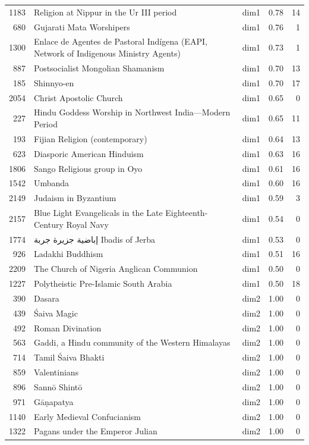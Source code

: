 \begin{tabular}{rllrr}
1183 & Religion at Nippur in the Ur III period & dim1 & 0.78 & 14 \\
680 & Gujarati Mata Worshipers & dim1 & 0.76 & 1 \\
1300 & Enlace de Agentes de Pastoral Indígena (EAPI, Network of Indigenous Ministry Agents) & dim1 & 0.73 & 1 \\
887 & Postsocialist Mongolian Shamanism & dim1 & 0.70 & 13 \\
185 & Shinnyo-en & dim1 & 0.70 & 17 \\
2054 & Christ Apostolic Church & dim1 & 0.65 & 0 \\
227 & Hindu Goddess Worship in Northwest India—Modern Period & dim1 & 0.65 & 11 \\
193 & Fijian Religion (contemporary) & dim1 & 0.64 & 13 \\
623 & Diasporic American Hinduism & dim1 & 0.63 & 16 \\
1806 & Sango Religious group in Oyo & dim1 & 0.61 & 16 \\
1542 & Umbanda & dim1 & 0.60 & 16 \\
2149 & Judaism in Byzantium & dim1 & 0.59 & 3 \\
2157 & Blue Light Evangelicals in the Late Eighteenth-Century Royal Navy & dim1 & 0.54 & 0 \\
1774 & إباضية جزيرة جربة Ibadis of Jerba & dim1 & 0.53 & 0 \\
926 & Ladakhi Buddhism & dim1 & 0.51 & 16 \\
2209 & The Church of Nigeria Anglican Communion & dim1 & 0.50 & 0 \\
1227 & Polytheistic Pre-Islamic South Arabia & dim1 & 0.50 & 18 \\
390 & Dasara & dim2 & 1.00 & 0 \\
439 & Śaiva Magic & dim2 & 1.00 & 0 \\
492 & Roman Divination & dim2 & 1.00 & 0 \\
563 & Gaddi, a Hindu community of the Western Himalayas & dim2 & 1.00 & 0 \\
714 & Tamil Śaiva Bhakti & dim2 & 1.00 & 0 \\
859 & Valentinians & dim2 & 1.00 & 0 \\
896 & Sannō Shintō & dim2 & 1.00 & 0 \\
971 & Gāṇapatya & dim2 & 1.00 & 0 \\
1140 & Early Medieval Confucianism & dim2 & 1.00 & 0 \\
1322 & Pagans under the Emperor Julian & dim2 & 1.00 & 0 \\

\end{tabular}
